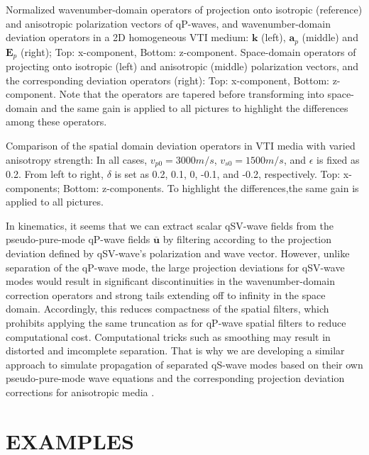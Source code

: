{
Normalized wavenumber-domain operators of projection onto isotropic (reference) and anisotropic
 polarization vectors of qP-waves, and wavenumber-domain deviation operators in a 2D homogeneous VTI medium: 
$\mathbf{k}$ (left), $\mathbf{a}_{p}$ (middle) and $\mathbf{E}_{p}$ (right);
 Top: x-component, Bottom: z-component.
}
{
Space-domain operators of projecting onto isotropic (left) and anisotropic (middle) polarization vectors, and
the corresponding deviation operators (right): Top: x-component, Bottom: z-component.
Note that the operators are tapered before transforming into space-domain and the same
gain is applied to all pictures to highlight the differences among these operators.
}


{Comparison of the spatial domain deviation operators in VTI media with varied anisotropy strength:
In all cases, $v_{p0}=3000m/s$, $v_{s0}=1500m/s$, and $\epsilon$ is fixed as 0.2.
From left to right, $\delta$ is set as 0.2, 0.1, 0, -0.1, and -0.2, respectively. Top: x-components;
 Bottom: z-components. To highlight the differences,the same gain is applied to all pictures.}

In kinematics, it seems that we can extract scalar qSV-wave fields from the pseudo-pure-mode qP-wave fields
 $\overline{\mathbf{u}}$ by filtering according to the projection deviation defined by qSV-wave's polarization
and wave vector. However, unlike separation of the qP-wave mode, the large projection deviations for
 qSV-wave modes would result in significant discontinuities in the wavenumber-domain correction operators and
 strong tails extending off to infinity in the space domain. Accordingly, this reduces compactness
of the spatial filters, which prohibits applying the same truncation as for qP-wave spatial filters to
 reduce computational cost. Computational tricks such as smoothing may result in distorted and imcomplete separation.
That is why we are developing a similar approach to simulate propagation 
of separated qS-wave modes based on their own pseudo-pure-mode wave equations and the corresponding
projection deviation corrections for anisotropic media \cite[]{kang.cheng:2012}.

\section{EXAMPLES}
